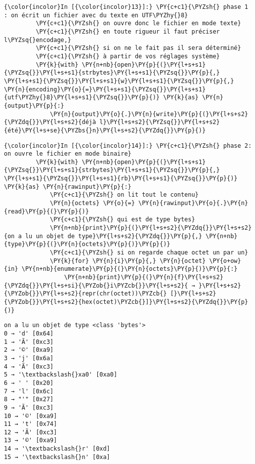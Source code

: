     \begin{Verbatim}[commandchars=\\\{\}]
{\color{incolor}In [{\color{incolor}13}]:} \PY{c+c1}{\PYZsh{} phase 1 : on écrit un fichier avec du texte en UTF\PYZhy{}8}
         \PY{c+c1}{\PYZsh{} on ouvre donc le fichier en mode texte}
         \PY{c+c1}{\PYZsh{} en toute rigueur il faut préciser l\PYZsq{}encodage,}
         \PY{c+c1}{\PYZsh{} si on ne le fait pas il sera déterminé}
         \PY{c+c1}{\PYZsh{} à partir de vos réglages système}
         \PY{k}{with} \PY{n+nb}{open}\PY{p}{(}\PY{l+s+s1}{\PYZsq{}}\PY{l+s+s1}{strbytes}\PY{l+s+s1}{\PYZsq{}}\PY{p}{,} \PY{l+s+s1}{\PYZsq{}}\PY{l+s+s1}{w}\PY{l+s+s1}{\PYZsq{}}\PY{p}{,} \PY{n}{encoding}\PY{o}{=}\PY{l+s+s1}{\PYZsq{}}\PY{l+s+s1}{utf\PYZhy{}8}\PY{l+s+s1}{\PYZsq{}}\PY{p}{)} \PY{k}{as} \PY{n}{output}\PY{p}{:}
             \PY{n}{output}\PY{o}{.}\PY{n}{write}\PY{p}{(}\PY{l+s+s2}{\PYZdq{}}\PY{l+s+s2}{déjà l}\PY{l+s+s2}{\PYZsq{}}\PY{l+s+s2}{été}\PY{l+s+se}{\PYZbs{}n}\PY{l+s+s2}{\PYZdq{}}\PY{p}{)}
\end{Verbatim}


    \begin{Verbatim}[commandchars=\\\{\}]
{\color{incolor}In [{\color{incolor}14}]:} \PY{c+c1}{\PYZsh{} phase 2: on ouvre le fichier en mode binaire}
         \PY{k}{with} \PY{n+nb}{open}\PY{p}{(}\PY{l+s+s1}{\PYZsq{}}\PY{l+s+s1}{strbytes}\PY{l+s+s1}{\PYZsq{}}\PY{p}{,} \PY{l+s+s1}{\PYZsq{}}\PY{l+s+s1}{rb}\PY{l+s+s1}{\PYZsq{}}\PY{p}{)} \PY{k}{as} \PY{n}{rawinput}\PY{p}{:}
             \PY{c+c1}{\PYZsh{} on lit tout le contenu}
             \PY{n}{octets} \PY{o}{=} \PY{n}{rawinput}\PY{o}{.}\PY{n}{read}\PY{p}{(}\PY{p}{)}
             \PY{c+c1}{\PYZsh{} qui est de type bytes}
             \PY{n+nb}{print}\PY{p}{(}\PY{l+s+s2}{\PYZdq{}}\PY{l+s+s2}{on a lu un objet de type}\PY{l+s+s2}{\PYZdq{}}\PY{p}{,} \PY{n+nb}{type}\PY{p}{(}\PY{n}{octets}\PY{p}{)}\PY{p}{)}
             \PY{c+c1}{\PYZsh{} si on regarde chaque octet un par un}
             \PY{k}{for} \PY{n}{i}\PY{p}{,} \PY{n}{octet} \PY{o+ow}{in} \PY{n+nb}{enumerate}\PY{p}{(}\PY{n}{octets}\PY{p}{)}\PY{p}{:}
                 \PY{n+nb}{print}\PY{p}{(}\PY{n}{f}\PY{l+s+s2}{\PYZdq{}}\PY{l+s+si}{\PYZob{}i\PYZcb{}}\PY{l+s+s2}{ → }\PY{l+s+s2}{\PYZob{}}\PY{l+s+s2}{repr(chr(octet))\PYZcb{} [}\PY{l+s+s2}{\PYZob{}}\PY{l+s+s2}{hex(octet)\PYZcb{}]}\PY{l+s+s2}{\PYZdq{}}\PY{p}{)}
\end{Verbatim}


    \begin{Verbatim}[commandchars=\\\{\}]
on a lu un objet de type <class 'bytes'>
0 → 'd' [0x64]
1 → 'Ã' [0xc3]
2 → '©' [0xa9]
3 → 'j' [0x6a]
4 → 'Ã' [0xc3]
5 → '\textbackslash{}xa0' [0xa0]
6 → ' ' [0x20]
7 → 'l' [0x6c]
8 → "'" [0x27]
9 → 'Ã' [0xc3]
10 → '©' [0xa9]
11 → 't' [0x74]
12 → 'Ã' [0xc3]
13 → '©' [0xa9]
14 → '\textbackslash{}r' [0xd]
15 → '\textbackslash{}n' [0xa]

    \end{Verbatim}

